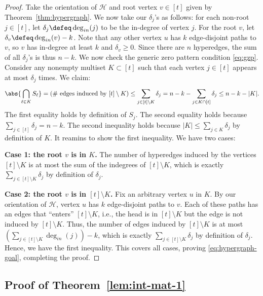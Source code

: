 \documentclass{article}[11pt]
\begin{document}
  \begin{proof}
    Take the orientation of $\mathcal{H}$ and root vertex $v\in[t]$ given by Theorem~\ref{thm:hypergraph}.
    We now take our $\delta_j$'s as follows: for each non-root $j\in[t]$, let $\delta_j\defeq \deg_{in} (j)$ to be the in-degree of vertex $j$. 
    For the root $v$, let $\delta_v\defeq \deg_{in}(v)-k$.
    Note that any other vertex $u$ has $k$ edge-disjoint paths to $v$, so $v$ has in-degree at least $k$ and $\delta_v \ge 0$.
    Since there are $n$ hyperedges, the sum of all $\delta_j$'s is thus $n - k$.
    We now check the generic zero pattern condition \eqref{eq:gzp}.
    Consider any nonempty multiset $K\subset [t]$ such that each vertex $j \in [t]$ appears at most $\delta_j$ times. We claim:
    \begin{align}
      \abs{\bigcap_{\ell\in K} S_\ell} = (\text{\# edges induced by $[t]\setminus K$}) \le \sum_{j\in [t]\setminus K}^{} \delta_j = n-k - \sum_{j\in K\cap [t]}^{} \delta_j \le n-k-|K|.
      \label{eq:hypergraph-goal}
    \end{align}
    The first equality holds by definition of $S_j$.
    The second equality holds because $\sum_{j\in[t]}\delta_j=n-k$.
    The second inequality holds because $|K| \le \sum_{j \in K} \delta_j$ by definition of $K$.
    It reamins to show the first inequality.
    We have two cases:
    
    \noindent\textbf{Case 1: the root $v$ is in $K$.}
    The number of hyperedges induced by the vertices $[t]\setminus K$ is at most the sum of the indegrees of $[t]\setminus K$, which is exactly $\sum_{j\in [t]\setminus K}^{} \delta_j$ by definition of $\delta_j$.
    
    \noindent\textbf{Case 2: the root $v$ is in $[t]\setminus K$.} 
    Fix an arbitrary vertex $u$ in $K$.
    By our orientation of $\mathcal{H}$, vertex $u$ has $k$ edge-disjoint paths to $v$. Each of these paths has an edges that ``enters'' $[t] \setminus K$, i.e., the head is in $[t] \setminus K$ but the edge is not induced by $[t]\setminus K$.
    Thus, the number of edges induced by $[t]\setminus K$ is at most $(\sum_{j\in[t]\setminus K}^{} \deg_{in}(j)) - k$, which is exactly $\sum_{j\in[t]\setminus K}\delta_j$ by definition of $\delta_j$.
    Hence, we have the first inequality.
    This covers all cases, proving \eqref{eq:hypergraph-goal}, completing the proof.
  \end{proof}
 



\subsection{Proof of Theorem~\ref{lem:int-mat-1}}
\label{subapp:int-mat-1-proof}
\end{document}
